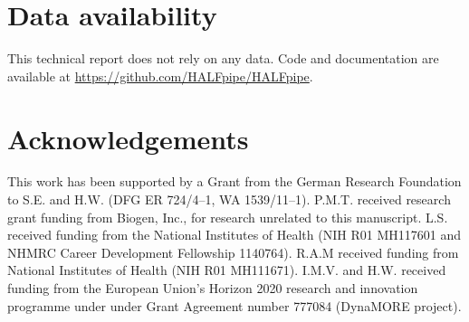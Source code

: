 \documentclass{lea}
\begin{document}








\section{Data availability}

This technical report does not rely on any data. Code and documentation are
available at \url{https://github.com/HALFpipe/HALFpipe}.

\section{Acknowledgements}

This work has been supported by a Grant from the German Research
Foundation to S.E. and H.W. (DFG ER 724/4--1, WA 1539/11--1).
P.M.T. received research grant funding from Biogen, Inc., for research
unrelated to this manuscript.
L.S. received funding from the National Institutes of Health (NIH R01
MH117601 and NHMRC Career Development Fellowship 1140764).
R.A.M received funding from National Institutes of Health (NIH R01
MH111671).
I.M.V. and H.W. received funding from the European Union's Horizon 2020
research and innovation programme under under Grant Agreement number
777084 (DynaMORE project).

\printbibliography
\end{document}
